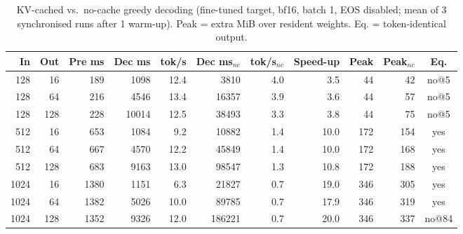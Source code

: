 \begin{table}[t]
\centering
\footnotesize
\caption{KV-cached vs.\ no-cache greedy decoding (fine-tuned target, bf16, batch 1, EOS disabled; mean of 3 synchronised runs after 1 warm-up). Peak = extra MiB over resident weights. Eq. = token-identical output.}
\label{tab:kv}
\begin{tabular}{rrrrrrrrrrc}
\toprule
In & Out & Pre ms & Dec ms & tok/s & Dec ms$_{nc}$ & tok/s$_{nc}$ & Speed-up & Peak & Peak$_{nc}$ & Eq. \\
\midrule
128 & 16 & 189 & 1098 & 12.4 & 3810 & 4.0 & 3.5 & 44 & 42 & no@5 \\
128 & 64 & 216 & 4546 & 13.4 & 16357 & 3.9 & 3.6 & 44 & 57 & no@5 \\
128 & 128 & 228 & 10014 & 12.5 & 38493 & 3.3 & 3.8 & 44 & 75 & no@5 \\
512 & 16 & 653 & 1084 & 9.2 & 10882 & 1.4 & 10.0 & 172 & 154 & yes \\
512 & 64 & 667 & 4570 & 12.2 & 45849 & 1.4 & 10.0 & 172 & 168 & yes \\
512 & 128 & 683 & 9163 & 13.0 & 98547 & 1.3 & 10.8 & 172 & 188 & yes \\
1024 & 16 & 1380 & 1151 & 6.3 & 21827 & 0.7 & 19.0 & 346 & 305 & yes \\
1024 & 64 & 1382 & 5026 & 10.0 & 89785 & 0.7 & 17.9 & 346 & 319 & yes \\
1024 & 128 & 1352 & 9326 & 12.0 & 186221 & 0.7 & 20.0 & 346 & 337 & no@84 \\
\bottomrule
\end{tabular}
\end{table}
